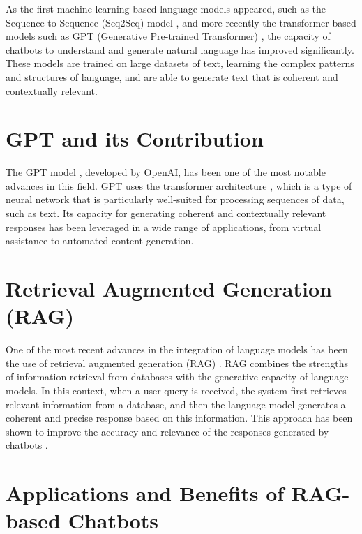 \documentclass[a4paper,12pt,twoside]{ThesisStyle}
\begin{document}
As the first machine learning-based language models appeared, such as the Sequence-to-Sequence (Seq2Seq) model \cite{Sutskever2014SequenceSequenceLearningNeural}, and more recently the transformer-based models such as GPT (Generative Pre-trained Transformer) \cite{Vaswani2023AttentionNeed, Radford2018ImprovingLU}, the capacity of chatbots to understand and generate natural language has improved significantly. These models are trained on large datasets of text, learning the complex patterns and structures of language, and are able to generate text that is coherent and contextually relevant.

\section{GPT and its Contribution}
\label{sec:gpt}

The GPT model \cite{Radford2018ImprovingLU}, developed by OpenAI, has been one of the most notable advances in this field. GPT uses the transformer architecture \cite{Vaswani2023AttentionNeed}, which is a type of neural network that is particularly well-suited for processing sequences of data, such as text. Its capacity for generating coherent and contextually relevant responses has been leveraged in a wide range of applications, from virtual assistance to automated content generation.

\section{Retrieval Augmented Generation (RAG)}
\label{sec:rag}

One of the most recent advances in the integration of language models has been the use of retrieval augmented generation (RAG) \cite{Lewis2021RetrievalAugmentedGeneration}. RAG combines the strengths of information retrieval from databases with the generative capacity of language models. In this context, when a user query is received, the system first retrieves relevant information from a database, and then the language model generates a coherent and precise response based on this information. This approach has been shown to improve the accuracy and relevance of the responses generated by chatbots \cite{Lewis2021RetrievalAugmentedGeneration}.

\section{Applications and Benefits of RAG-based Chatbots}
\label{sec:applications}
\end{document}
